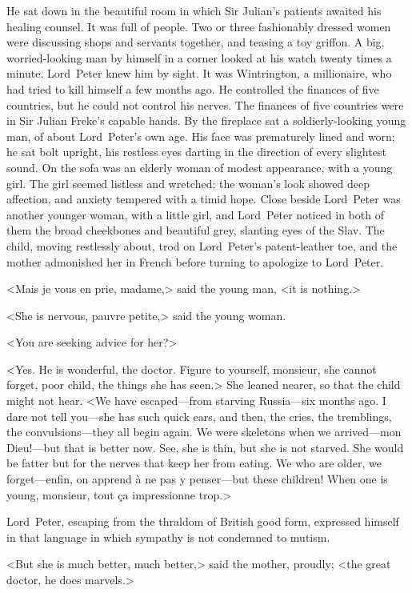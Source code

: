 He sat down in the beautiful room in which Sir Julian's patients awaited his healing counsel. It was full of people. Two or three fashionably dressed women were discussing shops and servants together, and teasing a toy griffon. A big, worried-looking man by himself in a corner looked at his watch twenty times a minute. Lord~Peter knew him by sight. It was Wintrington, a millionaire, who had tried to kill himself a few months ago. He controlled the finances of five countries, but he could not control his nerves. The finances of five countries were in Sir Julian Freke's capable hands. By the fireplace sat a soldierly-looking young man, of about Lord~Peter's own age. His face was prematurely lined and worn; he sat bolt upright, his restless eyes darting in the direction of every slightest sound. On the sofa was an elderly woman of modest appearance, with a young girl. The girl seemed listless and wretched; the woman's look showed deep affection, and anxiety tempered with a timid hope. Close beside Lord~Peter was another younger woman, with a little girl, and Lord~Peter noticed in both of them the broad cheekbones and beautiful grey, slanting eyes of the Slav. The child, moving restlessly about, trod on Lord~Peter's patent-leather toe, and the mother admonished her in French before turning to apologize to Lord~Peter.

<Mais je vous en prie, madame,> said the young man, <it is nothing.>

<She is nervous, pauvre petite,> said the young woman.

<You are seeking advice for her?>

<Yes. He is wonderful, the doctor. Figure to yourself, monsieur, she cannot forget, poor child, the things she has seen.> She leaned nearer, so that the child might not hear. <We have escaped—from starving Russia—six months ago. I dare not tell you—she has such quick ears, and then, the cries, the tremblings, the convulsions—they all begin again. We were skeletons when we arrived—mon Dieu!—but that is better now. See, she is thin, but she is not starved. She would be fatter but for the nerves that keep her from eating. We who are older, we forget—enfin, on apprend à ne pas y penser—but these children! When one is young, monsieur, tout ça impressionne trop.>

Lord~Peter, escaping from the thraldom of British good form, expressed himself in that language in which sympathy is not condemned to mutism.

<But she is much better, much better,> said the mother, proudly; <the great doctor, he does marvels.>

